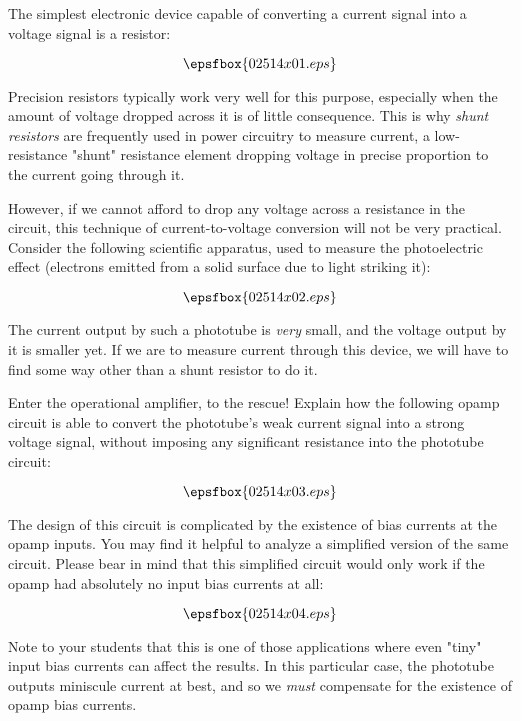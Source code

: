 

The simplest electronic device capable of converting a current signal into a voltage signal is a resistor:

$$\epsfbox{02514x01.eps}$$

Precision resistors typically work very well for this purpose, especially when the amount of voltage dropped across it is of little consequence.  This is why {\it shunt resistors} are frequently used in power circuitry to measure current, a low-resistance "shunt" resistance element dropping voltage in precise proportion to the current going through it.

However, if we cannot afford to drop any voltage across a resistance in the circuit, this technique of current-to-voltage conversion will not be very practical.  Consider the following scientific apparatus, used to measure the photoelectric effect (electrons emitted from a solid surface due to light striking it):

$$\epsfbox{02514x02.eps}$$

The current output by such a phototube is {\it very} small, and the voltage output by it is smaller yet.  If we are to measure current through this device, we will have to find some way other than a shunt resistor to do it.

Enter the operational amplifier, to the rescue!  Explain how the following opamp circuit is able to convert the phototube's weak current signal into a strong voltage signal, without imposing any significant resistance into the phototube circuit:

$$\epsfbox{02514x03.eps}$$







The design of this circuit is complicated by the existence of bias currents at the opamp inputs.  You may find it helpful to analyze a simplified version of the same circuit.  Please bear in mind that this simplified circuit would only work if the opamp had absolutely no input bias currents at all:

$$\epsfbox{02514x04.eps}$$







Note to your students that this is one of those applications where even "tiny" input bias currents can affect the results.  In this particular case, the phototube outputs miniscule current at best, and so we {\it must} compensate for the existence of opamp bias currents.





